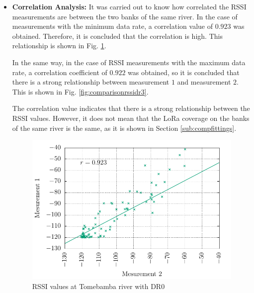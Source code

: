 \begin{itemize}

\item \textbf{Correlation Analysis:} It was carried out to know how correlated the RSSI measurements are between the two banks of the same river.
In the case of measurements with the minimum data rate, a correlation value of $0.923$ was obtained. Therefore, it is concluded that the correlation is high. This relationship is shown in Fig. \ref{fig:comparisonrssidr0}.


In the same way, in the case of RSSI measurements with the maximum data rate, a correlation coefficient of $0.922$ was obtained, so it is concluded that there is a strong relationship between measurement $1$ and measurement $2$. This is shown in Fig. \ref{fig:comparisonrssidr3}.


The correlation value indicates that there is a strong relationship between the RSSI values. However, it does not mean that the LoRa coverage on the banks of the same river is the same, as it is shown in Section \ref{sub:compfittings}.

\begin{figure}[!htb]
    \centering
      \includegraphics[width=\columnwidth]{Figure6}
      \caption{RSSI values at Tomebamba river with DR0}
      \label{fig:comparisonrssidr0}
\end{figure}


\end{itemize}

